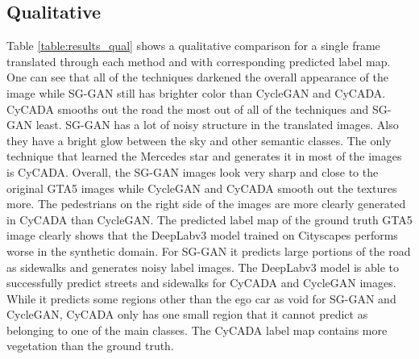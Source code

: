 \subsection{Qualitative}
Table \ref{table:results_qual} shows a qualitative comparison for a single frame translated through each method and with corresponding predicted label map. One can see that all of the techniques darkened the overall appearance of the image while SG-GAN still has brighter color than CycleGAN and CyCADA. CyCADA smooths out the road the most out of all of the techniques and SG-GAN least. SG-GAN has a lot of noisy structure in the translated images. Also they have a bright glow between the sky and other semantic classes. The only technique that learned the Mercedes star and generates it in most of the images is CyCADA. Overall, the SG-GAN images look very sharp and close to the original GTA5 images while CycleGAN and CyCADA smooth out the textures more. The pedestrians on the right side of the images are more clearly generated in CyCADA than CycleGAN. The predicted label map of the ground truth GTA5 image clearly shows that the DeepLabv3 model trained on Cityscapes performs worse in the synthetic domain. For SG-GAN it predicts large portions of the road as sidewalks and generates noisy label images. The DeepLabv3 model is able to successfully predict streets and sidewalks for CyCADA and CycleGAN images. While it predicts some regions other than the ego car as void for SG-GAN and CycleGAN, CyCADA only has one small region that it cannot predict as belonging to one of the main classes. The CyCADA label map contains more vegetation than the ground truth. 







